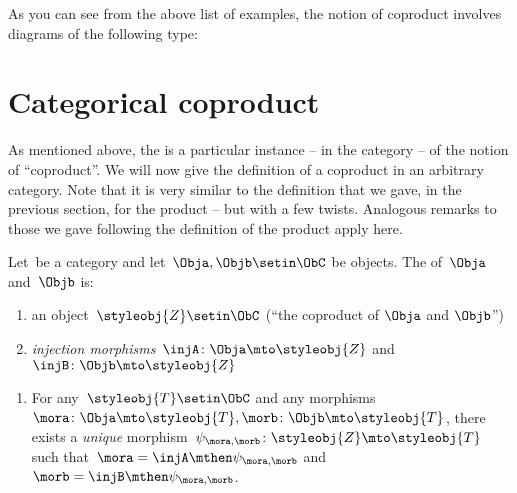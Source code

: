 
As you can see from the above list of examples, the notion of coproduct involves diagrams of the following type:
%

\section{Categorical coproduct}

As mentioned above, the  is a particular instance -- in the category \Set  -- of the notion of ``coproduct''.
We will now give the definition of a coproduct in an arbitrary category.
Note that it is very similar to the definition that we gave, in the previous section, for the product -- but with a few twists.
Analogous remarks to those we gave following the definition of the product apply here.
\begin{ctdefinition}
    \label{def:catcoproduct}
    Let~\CatC be a category and let~$\Obja, \Objb \setin \ObC$ be objects.
    The  of~$\Obja$ and~$\Objb$ is: \\
    \constit
    \begin{enumerate}
        \item an object~$\styleobj{Z} \setin \ObC$ (``the coproduct of $\Obja$ and $\Objb$'')
        \item \emph{injection morphisms}~$\injA \colon \Obja \mto \styleobj{Z} $ and~$\injB \colon \Objb \mto \styleobj{Z} $
    \end{enumerate}
    \condit
    \begin{enumerate}
        \item For any~$\styleobj{T} \setin \ObC$ and any morphisms~$\mora \colon  \Obja \mto \styleobj{T}, \morb \colon \Objb \mto \styleobj{T}$, there exists a \emph{unique} morphism~$\psi_{\mora, \morb} \colon \styleobj{Z} \mto \styleobj{T}$ such that~$\mora = \injA\mthen \psi_{\mora, \morb}$ and~$\morb = \injB \mthen \psi_{\mora,\morb}$.
    \end{enumerate}
\end{ctdefinition}

